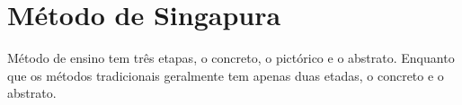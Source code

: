 \chapter{Método de Singapura}

Método de ensino tem três etapas, o concreto, o pictórico e o abstrato. Enquanto que os métodos tradicionais geralmente tem apenas duas etadas, o concreto e o abstrato.

